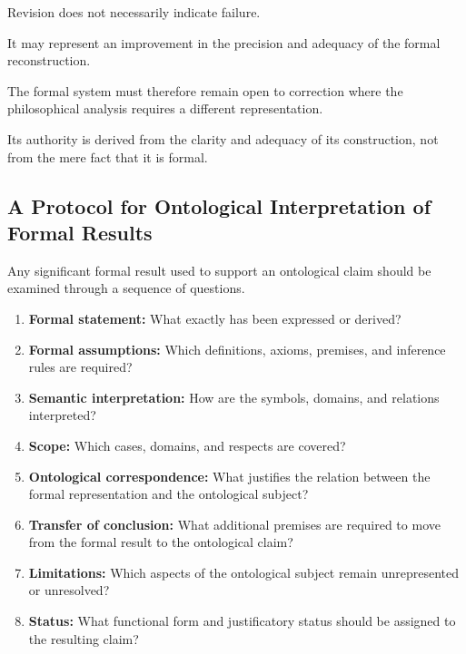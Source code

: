 Revision does
not necessarily
indicate failure.

It may
represent an
improvement in
the precision
and adequacy
of the
formal reconstruction.

The formal
system must
therefore remain
open to
correction where
the philosophical
analysis requires
a different
representation.

Its authority
is derived
from the
clarity and
adequacy of
its construction,
not from
the mere
fact that
it is
formal.

\subsection{A Protocol for Ontological Interpretation of Formal Results}

Any significant
formal result
used to support
an ontological
claim should
be examined
through a
sequence of
questions.

\begin{enumerate}
    \item \textbf{Formal statement:}
    What exactly
    has been
    expressed
    or derived?

    \item \textbf{Formal assumptions:}
    Which definitions,
    axioms, premises,
    and inference
    rules are
    required?

    \item \textbf{Semantic interpretation:}
    How are
    the symbols,
    domains,
    and relations
    interpreted?

    \item \textbf{Scope:}
    Which cases,
    domains,
    and respects
    are covered?

    \item \textbf{Ontological correspondence:}
    What justifies
    the relation
    between the
    formal representation
    and the
    ontological subject?

    \item \textbf{Transfer of conclusion:}
    What additional
    premises are
    required to
    move from
    the formal
    result to
    the ontological
    claim?

    \item \textbf{Limitations:}
    Which aspects
    of the
    ontological subject
    remain unrepresented
    or unresolved?

    \item \textbf{Status:}
    What functional
    form and
    justificatory status
    should be
    assigned to
    the resulting
    claim?
\end{enumerate}

